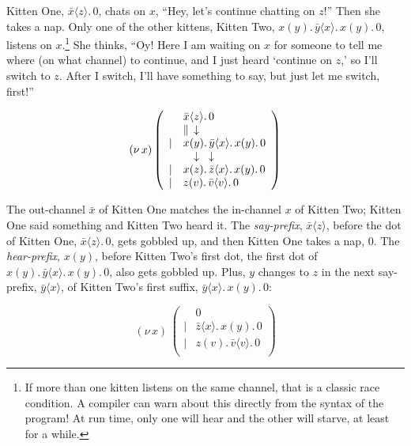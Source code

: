 \documentclass[10pt,oneside,x11names]{article}
\newcommand\napping    [0]{0}
\newcommand\chatting   [3]{\bar{#1}\langle{#2}\rangle{}.\,#3}
\newcommand\listening  [3]{#1(#2).\,#3}
\newcommand\whispering [2]{(\nu\,#1)\,{#2}}
\newcommand{\kitOne}{\chatting{x}{z}{\napping}}
\newcommand{\kitTwo}{\listening{x}{y}{\chatting{y}{x}{\listening{x}{y}{\napping}}}}
\newcommand{\kitThree}{\listening{z}{v}{\chatting{v}{v}{\napping}}}
\newcommand{\kitTwoSuffixx}{\chatting{y}{x}{\listening{x}{y}{\napping}}}
\theoremstyle{definition}
\theoremstyle{warning}
\begin{document}
Kitten One, \(\kitOne\), chats on \(x\), ``Hey, let's continue chatting
on \(z\)!'' Then she takes a nap. Only one of the other kittens,
Kitten Two, \(\kitTwo\), listens on \(x\).\footnote{If more than one
kitten listens on the same channel, that is a classic race
condition. A compiler can warn about this directly from the syntax
of the program! At run time, only one will hear and the other will
starve, at least for a while.} She thinks, ``Oy! Here I am waiting
on \(x\) for someone to tell me where (on what channel) to continue,
and I just heard `continue on \(z\),' so I'll switch to \(z\). After I
switch, I'll have something to say, but just let me switch,
first!''

\begin{equation}
\label{eqn:the-first-chat}
\whispering{x}{\left(
\begin{array}{clll}
 {}     & \kitOne \\
 {}     & \parallel \hspace{4.5pt} \downarrow \\
 \vert  & \kitTwo \\
 {}     & \hspace{9.5pt}\downarrow\hspace{8.5pt}\downarrow \\
 \vert  & \listening{x}{z}{\chatting{z}{x}{\listening{x}{y}{\napping}}} \\
 \vert  & \kitThree \\
\end{array}\right)}
\end{equation}

The out-channel \(\bar{x}\) of Kitten One matches the in-channel \(x\)
of Kitten Two; Kitten One said something and Kitten Two heard it.
The \emph{say-prefix}, \(\bar{x}\langle{}z\rangle\), before the dot of
Kitten One, \(\kitOne\), gets gobbled up, and then Kitten One takes a
nap, \(0\). The \emph{hear-prefix}, \(x(y)\), before Kitten Two's first dot, the
first dot of \(\kitTwo\), also gets gobbled up. Plus, \(y\) changes to
\(z\) in the next say-prefix, \(\bar{y}\langle{x}\rangle\), of Kitten
Two's first suffix, \(\kitTwoSuffixx\):

\begin{equation}
\label{eqn:after-step-one}
\whispering{x}{\left(
\begin{array}{clll}
 {}     & \napping  \\
 \vert  & \chatting{z}{x}{\listening{x}{y}{\napping}} \\
 \vert  & \listening{z}{v}{\chatting{v}{v}{\napping}} \\
\end{array}\right)}
\end{equation}
\end{document}
